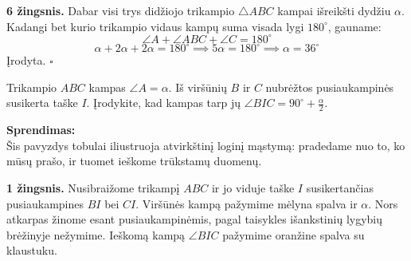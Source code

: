 \documentclass[11pt,a4paper]{scrartcl}
\begin{document}
\textbf{6 žingsnis.} Dabar visi trys didžiojo trikampio $\triangle ABC$ kampai išreikšti dydžiu $\alpha$. Kadangi bet kurio trikampio vidaus kampų suma visada lygi $180^\circ$, gauname:
$$
\angle A + \angle ABC + \angle C = 180^\circ
$$
$$
\alpha + 2\alpha + 2\alpha = 180^\circ \implies 5\alpha = 180^\circ \implies \alpha = 36^\circ
$$
Įrodyta. \hfill $\square$


\newpage
\begin{example}
Trikampio $ABC$ kampas $\angle A = \alpha$. Iš viršūnių $B$ ir $C$ nubrėžtos pusiaukampinės susikerta taške $I$. Įrodykite, kad kampas tarp jų $\angle BIC = 90^\circ + \frac{\alpha}{2}$.
\end{example}
\textbf{Sprendimas:}\\
Šis pavyzdys tobulai iliustruoja atvirkštinį loginį mąstymą: pradedame nuo to, ko mūsų prašo, ir tuomet ieškome trūkstamų duomenų.

\textbf{1 žingsnis.} Nusibraižome trikampį $ABC$ ir jo viduje taške $I$ susikertančias pusiaukampines $BI$ bei $CI$. Viršūnės kampą pažymime mėlyna spalva ir $\alpha$. Nors atkarpas žinome esant pusiaukampinėmis, pagal taisykles išankstinių lygybių brėžinyje nežymime. Ieškomą kampą $\angle BIC$ pažymime oranžine spalva su klaustuku.
\begin{center}
\end{center}
\end{document}

